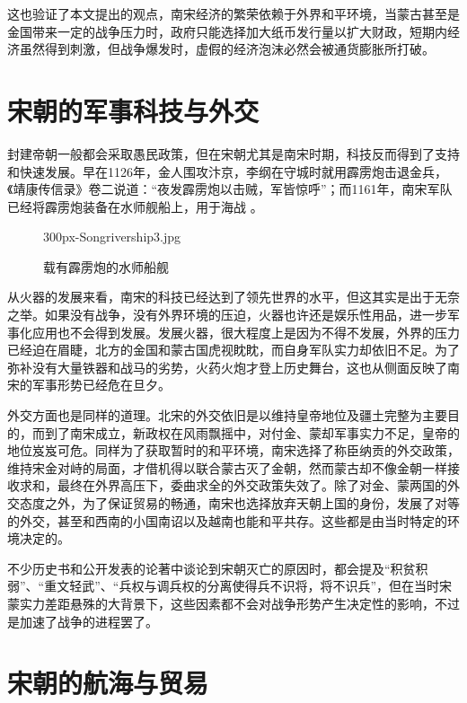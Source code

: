 \documentclass[final]{cvpr}
\begin{document}
这也验证了本文提出的观点，南宋经济的繁荣依赖于外界和平环境，当蒙古甚至是金国带来一定的战争压力时，政府只能选择加大纸币发行量以扩大财政，短期内经济虽然得到刺激，但战争爆发时，虚假的经济泡沫必然会被通货膨胀所打破。


\section{宋朝的军事科技与外交}

封建帝朝一般都会采取愚民政策，但在宋朝尤其是南宋时期，科技反而得到了支持和快速发展。早在1126年，金人围攻汴京，李纲在守城时就用霹雳炮击退金兵，《靖康传信录》卷二说道：“夜发霹雳炮以击贼，军皆惊呼”；而1161年，南宋军队已经将霹雳炮装备在水师舰船上，用于海战\cite{霹雳炮} \cite{中国军事通览}。

\begin{figure}[h]
  	\begin{overpic}[width=\columnwidth]{300px-Songrivership3.jpg}
    \end{overpic}
    \caption{载有霹雳炮的水师船舰
    }\label{fig:colorFre}
\end{figure}

从火器的发展来看，南宋的科技已经达到了领先世界的水平，但这其实是出于无奈之举。如果没有战争，没有外界环境的压迫，火器也许还是娱乐性用品，进一步军事化应用也不会得到发展。发展火器，很大程度上是因为不得不发展，外界的压力已经迫在眉睫，北方的金国和蒙古国虎视眈眈，而自身军队实力却依旧不足。为了弥补没有大量铁器和战马的劣势，火药火炮才登上历史舞台，这也从侧面反映了南宋的军事形势已经危在旦夕。

外交方面也是同样的道理。北宋的外交依旧是以维持皇帝地位及疆土完整为主要目的，而到了南宋成立，新政权在风雨飘摇中，对付金、蒙却军事实力不足，皇帝的地位岌岌可危。同样为了获取暂时的和平环境，南宋选择了称臣纳贡的外交政策，维持宋金对峙的局面，才借机得以联合蒙古灭了金朝，然而蒙古却不像金朝一样接收求和\cite{宋代外交史}，最终在外界高压下，委曲求全的外交政策失效了。除了对金、蒙两国的外交态度之外，为了保证贸易的畅通，南宋也选择放弃天朝上国的身份，发展了对等的外交，甚至和西南的小国南诏以及越南也能和平共存。这些都是由当时特定的环境决定的。

不少历史书和公开发表的论著中谈论到宋朝灭亡的原因时，都会提及“积贫积弱”、“重文轻武”、“兵权与调兵权的分离使得兵不识将，将不识兵”，但在当时宋蒙实力差距悬殊的大背景下，这些因素都不会对战争形势产生决定性的影响，不过是加速了战争的进程罢了。


\section{宋朝的航海与贸易}
\end{document}
